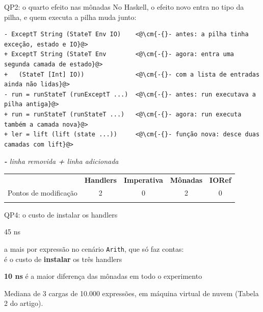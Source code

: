 \documentclass[aspectratio=169,10pt,xcolor={table}]{beamer}
\newcommand{\oc}[1]{\textcolor{marinho}{#1}}
\newcommand{\hs}[1]{\textcolor{rosa}{#1}}
\newcommand{\legenda}[1]{\par\vskip1.5mm{\centering\footnotesize\itshape\color{corpo!85}#1\par}}
\newcommand{\fonte}[1]{\par\vfill{\fontsize{7}{9}\selectfont\color{rodape}#1\par}\vskip1mm}
\newcommand{\topo}{\arrayrulecolor{texto}\specialrule{0.6pt}{0pt}{3pt}}
\newcommand{\meio}{\arrayrulecolor{texto}\specialrule{0.4pt}{3pt}{3pt}}
\newcommand{\fim}{\arrayrulecolor{texto}\specialrule{0.6pt}{3pt}{0pt}}
\newcommand{\cm}[1]{\textcolor{comentario}{\itshape #1}}
\begin{document}
\begin{frame}[fragile]{QP2: o quarto efeito nas mônadas}
  No Haskell, o efeito novo entra no tipo da pilha, e quem executa a pilha muda junto:
  \vskip3mm
\begin{lstlisting}[language=DiffTCC]
- ExceptT String (StateT Env IO)    <@\cm{-{}- antes: a pilha tinha exceção, estado e IO}@>
+ ExceptT String (StateT Env        <@\cm{-{}- agora: entra uma segunda camada de estado}@>
+   (StateT [Int] IO))              <@\cm{-{}- com a lista de entradas ainda não lidas}@>
- run = runStateT (runExceptT ...)  <@\cm{-{}- antes: run executava a pilha antiga}@>
+ run = runStateT (runStateT ...)   <@\cm{-{}- agora: run executa também a camada nova}@>
+ ler = lift (lift (state ...))     <@\cm{-{}- função nova: desce duas camadas com lift}@>
\end{lstlisting}
\legenda{\textcolor{rosa}{\textbf{-}} linha removida \qquad \textcolor{verdeazul}{\textbf{+}} linha adicionada}
  \vskip1mm
  \begin{center}\small
  \begin{tabular}{lcccc}
    \topo
    & \oc{\textbf{Handlers}} & \textbf{Imperativa} & \hs{\textbf{Mônadas}} & \textbf{IORef} \\
    \meio
    Pontos de modificação & 2 & 0 & 2 & 0 \\
    \fim
  \end{tabular}
  \end{center}
\end{frame}

\begin{frame}{QP4: o custo de instalar os handlers}
  \centering
  \vskip2mm
  {\titulofonte\fontsize{50}{54}\selectfont\color{marinho}45 ns\par}
  \vskip2mm
  {\large a mais por expressão no cenário \texttt{Arith}, que só faz contas:\\ é o custo de \textbf{instalar} os três handlers\par}
  \vskip5mm
  {\large\hs{\textbf{10 ns}} é a maior diferença das mônadas em todo o experimento\par}
  \fonte{Mediana de 3 cargas de 10.000 expressões, em máquina virtual de nuvem (Tabela 2 do artigo).}
\end{frame}
\end{document}
